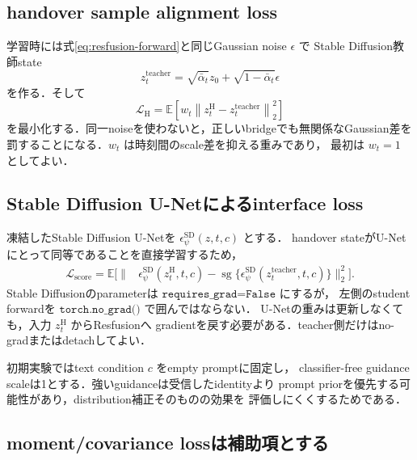 \documentclass[11pt,a4paper]{ltjsarticle}
\newcommand{\E}{\mathbb{E}}
\newcommand{\stopgrad}{\operatorname{sg}}
\begin{document}
\subsection{handover sample alignment loss}

学習時には式\eqref{eq:resfusion-forward}と同じGaussian noise \(\epsilon\) で
Stable Diffusion教師state
\[
  z_t^{\mathrm{teacher}}
  =
  \sqrt{\bar\alpha_t}z_0
  +\sqrt{1-\bar\alpha_t}\epsilon
\]
を作る．そして
\begin{equation}
  \mathcal L_{\mathrm H}
  =
  \E
  \left[
  w_t
  \left\lVert
    z_t^{\mathrm H}-z_t^{\mathrm{teacher}}
  \right\rVert_2^2
  \right]
\label{eq:handover-loss}
\end{equation}
を最小化する．同一noiseを使わないと，正しいbridgeでも無関係なGaussian差を
罰することになる．\(w_t\) は時刻間のscale差を抑える重みであり，
最初は \(w_t=1\) としてよい．

\subsection{Stable Diffusion U-Netによるinterface loss}

凍結したStable Diffusion U-Netを
\(\epsilon_\psi^{\mathrm{SD}}(z,t,c)\) とする．
handover stateがU-Netにとって同等であることを直接学習するため，
\begin{equation}
\begin{split}
  \mathcal L_{\mathrm{score}}
  =
  \E\bigl[
  \lVert&
    \epsilon_\psi^{\mathrm{SD}}
      (z_t^{\mathrm H},t,c)
    {}-
    \stopgrad\{
      \epsilon_\psi^{\mathrm{SD}}
      (z_t^{\mathrm{teacher}},t,c)
    \}
  \rVert_2^2
  \bigr].
\end{split}
\label{eq:score-loss}
\end{equation}
Stable Diffusionのparameterは \(\texttt{requires\_grad=False}\) にするが，
左側のstudent forwardを \(\texttt{torch.no\_grad()}\) で囲んではならない．
U-Netの重みは更新しなくても，入力 \(z_t^{\mathrm H}\) からResfusionへ
gradientを戻す必要がある．teacher側だけはno-gradまたはdetachしてよい．

初期実験ではtext condition \(c\) をempty promptに固定し，
classifier-free guidance scaleは1とする．強いguidanceは受信したidentityより
prompt priorを優先する可能性があり，distribution補正そのものの効果を
評価しにくくするためである．

\subsection{moment/covariance lossは補助項とする}
\end{document}
